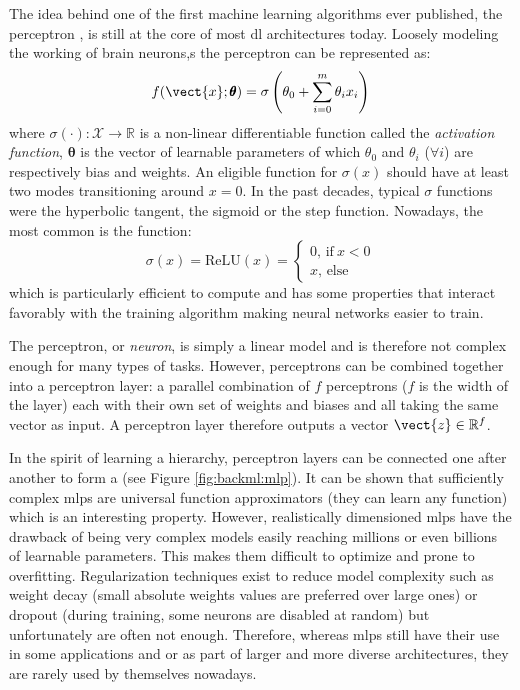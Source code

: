 The idea behind one of the first machine learning algorithms ever published, the
perceptron \cite{rosenblatt1958perceptron}, is still at the core of most
\acrlong{dl} architectures today. Loosely modeling the working of brain neurons,s
the perceptron can be represented as:
\begin{equation}
\label{eqn:backml:perceptron}
f(\vect{x};\pmb{\theta}) = \sigma\left(\theta_0 + \sum_{i=0}^m \theta_i x_i\right)
\end{equation}
where $\sigma(\cdot): \mathcal{X} \rightarrow \mathbb{R}$ is a non-linear
differentiable function called the \textit{activation function}, $\pmb{\theta}$ is the 
vector of learnable parameters of which $\theta_0$ and $\theta_i$ ($\forall i$) are 
respectively bias and weights. An eligible function
for $\sigma(x)$ should have at least two modes transitioning around $x=0$. In the
past decades, typical $\sigma$ functions were the hyperbolic tangent, the sigmoid
or the step function. Nowadays, the most common is the  function:
\begin{equation}
  \label{eqn:backml:relu}
  \sigma(x) = \text{ReLU}(x) = \begin{cases}
  0\text{, if}~ x < 0\\
  x\text{, else}
  \end{cases}
\end{equation}
which is particularly efficient to compute
and has some properties that interact favorably with the training algorithm making
neural networks easier to train.

The perceptron, or \textit{neuron}, is simply a linear model and is therefore not
complex enough for many types of tasks. However, perceptrons can be combined together
into a perceptron layer: a parallel combination of $f$ perceptrons ($f$ is the
width of the layer) each with their own set of weights and biases and all taking
the same vector as input. A perceptron layer therefore outputs a vector
$\vect{z} \in \mathbb{R}^f$.

In the spirit of learning a hierarchy, perceptron layers can be connected one
after another to form a  (see Figure \ref{fig:backml:mlp}). It
can be shown that sufficiently complex \acrshort{mlp}s are universal function
approximators (\ie they can learn any function) \cite{hornik1989multilayer}
which is an interesting property. However, realistically dimensioned \acrshort{mlp}s
have the drawback of being very complex models easily reaching millions or even
billions of learnable parameters. This makes them difficult to optimize and prone
to overfitting. Regularization techniques exist to reduce model complexity such
as weight decay (\ie small absolute weights values are preferred over large
ones) or dropout \cite{srivastava2014dropout} (\ie during training, some
neurons are disabled at random) but unfortunately are often not enough. Therefore,
whereas \acrshort{mlp}s still have their use in some applications and or as part
of larger and more diverse architectures, they are rarely used by themselves
nowadays.

